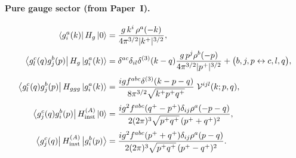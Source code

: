 \documentclass[11pt]{article}
\newcommand{\me}[3]{\left\langle #1 \right| #2 \left| #3 \right\rangle}
\newcommand{\dthree}{\delta^{(3)}}
\newcommand{\gl}[3]{g^{#1}_{#2}(#3)}
\newcommand{\Vggg}{\mathcal{V}}
\newcommand{\Hg}{H_{g}}
\newcommand{\Hggg}{H_{ggg}}
\begin{document}
\paragraph{Pure gauge sector (from Paper~I).}
\begin{align}
\me{\gl{a}{i}{k}}{\Hg}{0}&=\frac{g\,k^i\,\rho^a(-k)}{4\pi^{3/2}|k^+|^{3/2}},
\label{eq:M1}\\[2pt]
\me{\gl{c}{l}{q}\gl{b}{j}{p}}{\Hg}{\gl{a}{i}{k}}&=
\delta^{ac}\delta_{il}\dthree(k-q)\frac{g\,p^j\rho^b(-p)}{4\pi^{3/2}|p^+|^{3/2}}
+\big(b,j,p\leftrightarrow c,l,q\big),
\label{eq:M2}\\[2pt]
\me{\gl{c}{l}{q}\gl{b}{j}{p}}{\Hggg}{\gl{a}{i}{k}}&=
\frac{ig f^{abc}\dthree(k-p-q)}{8\pi^{3/2}\sqrt{k^+p^+q^+}}\;\Vggg^{ijl}(k;p,q),
\label{eq:M3}\\[2pt]
\me{\gl{c}{j}{q}\gl{b}{i}{p}}{H^{(A)}_{\rm inst}}{0}&=
\frac{ig^2f^{abc}(q^+-p^+)\delta_{ij}\rho^a(-p-q)}{2(2\pi)^3\sqrt{p^+q^+}\,(p^++q^+)^2},
\label{eq:M4}\\[2pt]
\me{\gl{c}{j}{q}}{H^{(A)}_{\rm inst}}{\gl{b}{i}{p}}&=
\frac{ig^2f^{abc}(p^++q^+)\delta_{ij}\rho^a(p-q)}{2(2\pi)^3\sqrt{p^+q^+}\,(p^+-q^+)^2}.
\label{eq:M5}
\end{align}
\end{document}
